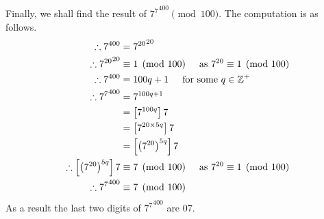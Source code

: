 \documentclass[a4paper]{article}
\begin{document}
\begin{enumerate}
\begin{enumerate}
		\bigbreak

		Finally, we shall find the result of $\displaystyle{{7^{7}}^{400} \pmod{100}}$. The computation is as follows.
		\begin{align*}
		\therefore {7}^{400} & = {{7}^{20}}^{20}\\
		\therefore {{7}^{20}}^{20} & \equiv 1 \pmod{100} \hspace{5mm} \text{as } 7^{20} \equiv 1 \pmod{100}\\
		\therefore 7^{400} & = 100q + 1 \hspace{5mm} \text{for some } q \in \mathbb{Z}^+\\
		\therefore {7^{7}}^{400} & = 7^{100q + 1}\\
		& = \left[7^{100q}\right]7\\
		& = \left[7^{20\times5q}\right]7\\
		& = \left[\left(7^{20}\right)^{5q}\right]7\\
		\therefore \left[\left(7^{20}\right)^{5q}\right]7 & \equiv 7 \pmod{100} \hspace{5mm} \text{as } 7^{20} \equiv 1 \pmod{100}\\
		\therefore {7^{7}}^{400} & \equiv 7 \pmod{100}\\
		\end{align*}
		As a result the last two digits of $\displaystyle{{7^{7}}^{400}}$ are $\displaystyle{07}$.

	\end{enumerate}

	\pagebreak


\end{enumerate}
\end{document}
